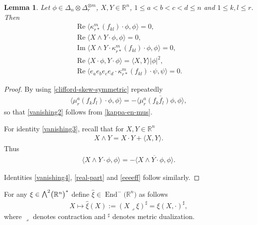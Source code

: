 \documentclass[pdftex]{sigma}
\newcommand{\ext}{\raise1pt\hbox{\small$\bigwedge$}}
\numberwithin{equation}{section}
\newtheorem{Lemma}[Theorem]{Lemma}
\begin{document}
\begin{Lemma}\label{lemma:vanishings} Let $\phi\in\Delta_n\otimes\Delta_r^{\otimes m}$, $X,Y\in\mathbb{R}^n$, $1\leq a<b<c<d\leq n$ and $1\leq k,l\leq r$. Then
\begin{gather}
\operatorname{Re}\big\langle \kappa_{r*}^m(f_{kl})\cdot \phi,\phi\big\rangle =0,\label{vanishing2}\\
\operatorname{Re}\langle X\wedge Y\cdot\phi,\phi\rangle =0,\label{vanishing3}\\
\operatorname{Im}\langle X\wedge Y\cdot \kappa_{r*}^m(f_{kl})\cdot\phi,\phi\rangle = 0,\label{vanishing4}\\
\operatorname{Re} \langle X\cdot \phi,Y\cdot\phi \rangle = \langle X,Y\rangle |\phi|^2, \label{real-part}\\
\operatorname{Re} \big\langle e_ae_be_ce_d\cdot \kappa_{r*}^m(f_{kl})\cdot\psi,\psi \big\rangle =0.\label{eeeeff}
\end{gather}
\end{Lemma}
\begin{proof}
By using \eqref{clifford-skew-symmetric} repeatedly
\begin{gather*}
 \langle \mu_{r}^a(f_kf_l)\cdot\phi,\phi\rangle = -\overline{\langle \mu_{r}^a(f_kf_l)\phi,\phi\rangle },
\end{gather*}
so that \eqref{vanishing2} follows from \eqref{kappa-en-mus}.

For identity \eqref{vanishing3}, recall that for $X, Y\in \mathbb{R}^n$
\begin{gather*} X\wedge Y = X\cdot Y + \langle X,Y\rangle .\end{gather*}
Thus
\begin{gather*}
 \langle X\wedge Y\cdot \phi,\phi\rangle = -\overline{\langle X\wedge Y \cdot\phi,\phi\rangle }.
\end{gather*}

Identities \eqref{vanishing4}, \eqref{real-part} and \eqref{eeeeff} follow similarly.
\end{proof}

For any $\xi\in\ext^2\big(\mathbb{R}^n\big)^*$ define $\hat\xi\in\operatorname{End}^-\big(\mathbb{R}^n\big)$ as follows
\begin{gather*}
 X \mapsto \hat\xi(X) := (X\lrcorner \xi)^\sharp =\xi(X,\cdot)^\sharp,
\end{gather*}
where $\lrcorner$ denotes contraction and $^\sharp$ denotes metric dualization.
\end{document}
